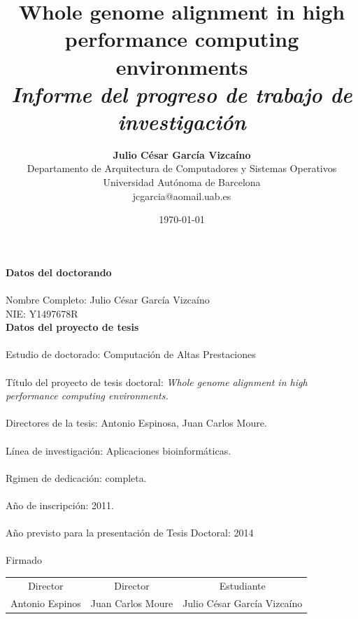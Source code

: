 \documentclass[12pt,a4paper]{article}
\title{ {\bf Whole genome alignment in high performance computing environments} \\
\it Informe del progreso de trabajo de investigaci\'on}
\author{ {\bf Julio C\'esar Garc\'ia Vizca\'ino}  \\ 
Departamento de Arquitectura de Computadores y Sistemas Operativos \\ 
Universidad Aut\'onoma de Barcelona\\ 
{\small jcgarcia@aomail.uab.es} 
}
\date{\today}
\begin{document}
\pagestyle{plain}
\maketitle
\pagebreak
{\Huge{\bf Datos del doctorando}}\\
{\Large \\Nombre Completo: Julio César García Vizcaíno\\}
\vspace{0.3cm}
{\Large NIE: Y1497678R\\}
{\Huge{\bf Datos del proyecto de tesis}}\\
\vspace{0.3cm}
{\Large \\Estudio de doctorado: Computación de Altas Prestaciones\\}
\vspace{0.3cm}
{\Large \\Título del proyecto de tesis doctoral: \emph{
Whole genome alignment in high performance computing environments.}\\}
\vspace{0.3cm}
{\Large \\Directores de la tesis: Antonio Espinosa, Juan Carlos Moure.\\}
\vspace{0.3cm}
{\Large \\Línea de investigación: Aplicaciones bioinformáticas.\\}
\vspace{0.3cm}
{\Large \\Rgimen de dedicación: completa.\\}
\vspace{0.3cm}
{\Large \\A\~no de inscripci\'on: 2011.\\}
\vspace{0.3cm}
{\Large \\A\~no previsto para la presentaci\'on de Tesis Doctoral: 2014\\}
\vspace{0.3cm}
{\large \\Firmado\\}
\vspace{2.8cm}
\begin{center}
\begin{tabular}{ c c c }
Director & Director & Estudiante\\
Antonio Espinos & Juan Carlos Moure & Julio C\'esar García Vizcaíno\\
\end{tabular}
\end{center}
\pagebreak
{}
\end{document}

